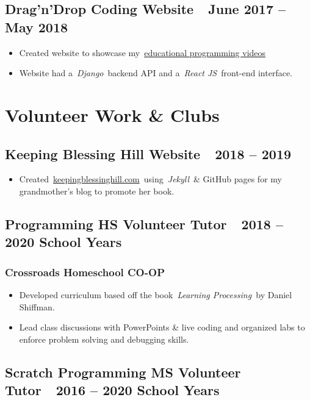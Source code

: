 \documentclass[letterpaper]{article}
\newcommand\textstyleHeadingivChar[1]{\textit{\textcolor[rgb]{0.6784314,0.30980393,0.05882353}{#1}}}
\newcommand\textstyleHyperlink[1]{\textcolor[rgb]{0.019607844,0.3882353,0.75686276}{#1}}
\newcommand\liststyleLFOi{%
\renewcommand\labelitemi{{}-}
\renewcommand\labelitemii{o}
\renewcommand\labelitemiii{${\blacksquare}$}
\renewcommand\labelitemiv{{\textbullet}}
}
\begin{document}
\subsection[Drag{}'n{}'Drop Coding Website\ \ June 2017 {}-- May 2018]{Drag'n'Drop Coding Website\ \ June 2017 -- May
2018}
\liststyleLFOi
\begin{itemize}
\item Created website to showcase
my\ \href{https://www.youtube.com/channel/UC44hbuzQZteAb82_8QzfBvw}{\textstyleHyperlink{educational programming
videos}}
\item Website had a\ \textstyleHeadingivChar{Django}\ backend API and a\ \textstyleHeadingivChar{React JS}\ front-end
interface.
\end{itemize}
\section{Volunteer Work \& Clubs}
\subsection[Keeping Blessing Hill Website\ \ 2018 {}-- 2019]{Keeping Blessing Hill Website\ \ 2018 -- 2019}
\liststyleLFOi
\begin{itemize}
\item
Created\ \href{http://www.keepingblessinghill.com/}{\textstyleHyperlink{keepingblessinghill.com}}\ using\ \textstyleHeadingivChar{Jekyll}\ \&
GitHub pages for my grandmother's blog to promote her book.
\end{itemize}
\subsection[Programming HS Volunteer Tutor\ \ 2018 {}-- 2020 School Years]{Programming HS Volunteer Tutor\ \ 2018 --
2020 School Years}
\subsubsection{Crossroads Homeschool CO-OP}
\liststyleLFOi
\begin{itemize}
\item Developed curriculum based off the book\ \textit{Learning Processing\ }by Daniel Shiffman.
\item Lead class discussions with PowerPoints \& live coding and organized labs to enforce problem solving and debugging
skills.
\end{itemize}
\subsection[Scratch Programming MS Volunteer Tutor\ \ 2016 {}-- 2020 School Years]{Scratch Programming MS Volunteer
Tutor\ \ 2016 -- 2020 School Years}
\end{document}
